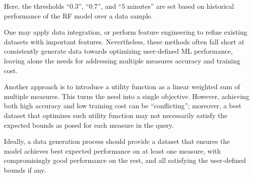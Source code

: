 \begin{example}
\vspace{-1ex}
\begin{center}
\end{center}

Here, the thresholds  
``$0.3$'', ``$0.7$'', and ``$5$ minutes'' 
are set based on historical  
performance of the  
RF model over 
a data sample. 

One may apply data integration, or 
perform feature engineering to 
refine existing datasets with important 
features. Nevertheless, these 
methods often fall short at consistently 
generate data towards optimizing 
user-defined ML performance, leaving 
alone the needs for addressing multiple measures 
\eg accuracy and 
training cost. 

Another approach is to 
introduce a utility function 
as a linear weighted sum 
of multiple measures. This 
turns the need into a single objective.  
However, achieving both high accuracy and 
low training cost %
can be ``conflicting''; moreover, a best dataset 
that optimizes such utility function may not 
necessarily satisfy the expected bounds as posed  
for each measure in the query. 

Ideally, a data generation process should provide 
a dataset that 
ensures the model achieves best expected performance on at least one measure, with compromisingly good performance on the rest, and all satisfying the user-defined bounds if any. 
\end{example}

